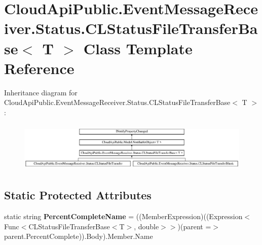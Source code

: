 \hypertarget{class_cloud_api_public_1_1_event_message_receiver_1_1_status_1_1_c_l_status_file_transfer_base_3_01_t_01_4}{\section{Cloud\-Api\-Public.\-Event\-Message\-Receiver.\-Status.\-C\-L\-Status\-File\-Transfer\-Base$<$ T $>$ Class Template Reference}
\label{class_cloud_api_public_1_1_event_message_receiver_1_1_status_1_1_c_l_status_file_transfer_base_3_01_t_01_4}
}
Inheritance diagram for Cloud\-Api\-Public.\-Event\-Message\-Receiver.\-Status.\-C\-L\-Status\-File\-Transfer\-Base$<$ T $>$\-:\begin{figure}[H]
\begin{center}
\leavevmode
\includegraphics[height=2.408602cm]{class_cloud_api_public_1_1_event_message_receiver_1_1_status_1_1_c_l_status_file_transfer_base_3_01_t_01_4}
\end{center}
\end{figure}
\subsection*{Static Protected Attributes}
\begin{DoxyCompactItemize}
\item 
\hypertarget{class_cloud_api_public_1_1_event_message_receiver_1_1_status_1_1_c_l_status_file_transfer_base_3_01_t_01_4_a7a101d30efe4226f3a88d4b59c34498a}{static string {\bfseries Percent\-Complete\-Name} = ((Member\-Expression)((Expression$<$Func$<$C\-L\-Status\-File\-Transfer\-Base$<$T$>$, double$>$$>$)(parent =$>$ parent.\-Percent\-Complete)).Body).Member.\-Name}\label{class_cloud_api_public_1_1_event_message_receiver_1_1_status_1_1_c_l_status_file_transfer_base_3_01_t_01_4_a7a101d30efe4226f3a88d4b59c34498a}

\end{DoxyCompactItemize}
